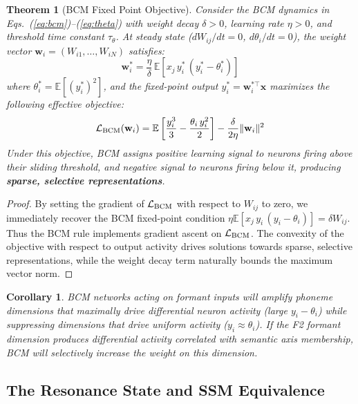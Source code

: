 \documentclass{article}
\newtheorem{theorem}{Theorem}
\newtheorem{corollary}{Corollary}
\begin{document}
\begin{theorem}[BCM Fixed Point Objective]
\label{thm:bcm}
Consider the BCM dynamics in Eqs.~(\ref{eq:bcm})--(\ref{eq:theta}) with weight decay $\delta > 0$, learning rate $\eta > 0$, and threshold time constant $\tau_\theta$. At steady state ($dW_{ij}/dt = 0$, $d\theta_i/dt = 0$), the weight vector $\mathbf{w}_i = (W_{i1}, \ldots, W_{iN})$ satisfies:
\[
\mathbf{w}_i^* = \frac{\eta}{\delta}\,\mathbb{E}[x_j\, y_i^*\,(y_i^* - \theta_i^*)]
\]
where $\theta_i^* = \mathbb{E}[(y_i^*)^2]$, and the fixed-point output $y_i^* = \mathbf{w}_i^{*\top} \mathbf{x}$ maximizes the following effective objective:
\begin{equation}
\mathcal{L}_{\rm BCM}(\mathbf{w}_i) = \mathbb{E}\left[\frac{y_i^3}{3} - \frac{\theta_i\, y_i^2}{2}\right] - \frac{\delta}{2\eta}\|\mathbf{w}_i\|^2
\label{eq:bcm_objective}
\end{equation}
Under this objective, BCM assigns positive learning signal to neurons firing above their sliding threshold, and negative signal to neurons firing below it, producing \textbf{sparse, selective representations}.
\end{theorem}

\begin{proof}
By setting the gradient of $\mathcal{L}_{\rm BCM}$ with respect to $W_{ij}$ to zero, we immediately recover the BCM fixed-point condition $\eta \mathbb{E}[x_j\, y_i\,(y_i - \theta_i)] = \delta W_{ij}$. Thus the BCM rule implements gradient ascent on $\mathcal{L}_{\rm BCM}$. The convexity of the objective with respect to output activity drives solutions towards sparse, selective representations, while the weight decay term naturally bounds the maximum vector norm.
\end{proof}

\begin{corollary}
BCM networks acting on formant inputs will amplify phoneme dimensions that maximally drive differential neuron activity (large $y_i - \theta_i$) while suppressing dimensions that drive uniform activity ($y_i \approx \theta_i$). If the F2 formant dimension produces differential activity correlated with semantic axis membership, BCM will selectively increase the weight on this dimension.
\end{corollary}

\subsection{The Resonance State and SSM Equivalence}
\label{sec:ssm}
\end{document}
